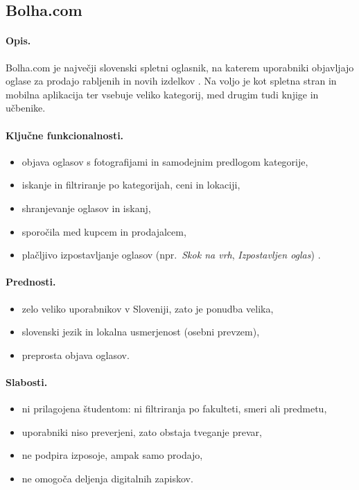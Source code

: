 \documentclass[12pt,a4paper]{article}
\begin{document}
\subsection{Bolha.com}

\paragraph{Opis.}
Bolha.com je največji slovenski spletni oglasnik, na katerem uporabniki
objavljajo oglase za prodajo rabljenih in novih izdelkov \cite{bolha,
bolha_app}. Na voljo je kot spletna stran in mobilna aplikacija ter vsebuje
veliko kategorij, med drugim tudi knjige in učbenike.

\paragraph{Ključne funkcionalnosti.}
\begin{itemize}[noitemsep]
    \item objava oglasov s fotografijami in samodejnim predlogom kategorije,
    \item iskanje in filtriranje po kategorijah, ceni in lokaciji,
    \item shranjevanje oglasov in iskanj,
    \item sporočila med kupcem in prodajalcem,
    \item plačljivo izpostavljanje oglasov (npr.\ \emph{Skok na vrh},
          \emph{Izpostavljen oglas}) \cite{bolha_app}.
\end{itemize}

\paragraph{Prednosti.}
\begin{itemize}[noitemsep]
    \item zelo veliko uporabnikov v Sloveniji, zato je ponudba velika,
    \item slovenski jezik in lokalna usmerjenost (osebni prevzem),
    \item preprosta objava oglasov.
\end{itemize}

\paragraph{Slabosti.}
\begin{itemize}[noitemsep]
    \item ni prilagojena študentom: ni filtriranja po fakulteti, smeri ali
          predmetu,
    \item uporabniki niso preverjeni, zato obstaja tveganje prevar,
    \item ne podpira izposoje, ampak samo prodajo,
    \item ne omogoča deljenja digitalnih zapiskov.
\end{itemize}
\end{document}

